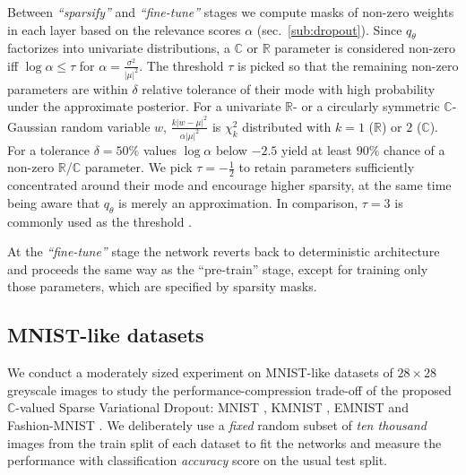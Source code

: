 \documentclass{article}
\newcommand{\real}{\mathbb{R}}
\newcommand{\cplx}{\mathbb{C}}
\begin{document}
Between \emph{``sparsify''} and \emph{``fine-tune''} stages we compute masks of non-zero
weights in each layer based on the relevance scores $\alpha$ (sec.~\ref{sub:dropout}).
Since $q_\theta$ factorizes into univariate distributions, a $\cplx$ or $\real$ parameter
is considered non-zero iff $\log \alpha \leq \tau$ for $
  \alpha = \tfrac{\sigma^2}{\lvert \mu \rvert^2}
$.
The threshold $\tau$ is picked so that the remaining non-zero parameters are within
$\delta$ relative tolerance of their mode with high probability under the approximate
posterior. For a univariate $\real$- or a circularly symmetric $\cplx$-Gaussian random
variable $w$, $
  \tfrac{k \lvert w - \mu \rvert^2}
        {\alpha \lvert \mu \rvert^2}
$ is $\chi^2_k$ distributed with $k=1$ ($\real$) or $2$ ($\cplx$).
%
For a tolerance $\delta = 50\%$ values $\log \alpha$ below $-2.5$ yield at least $90\%$
chance of a non-zero $\real$/$\cplx$ parameter. We pick $\tau = -\tfrac12$ to retain
parameters sufficiently concentrated around their mode and encourage higher sparsity,
at the same time being aware that $q_\theta$ is merely an approximation. In comparison,
$\tau = 3$ is commonly used as the threshold
\citep{molchanov_variational_2017,kingma_variational_2015}.

At the \emph{``fine-tune''} stage the network reverts back to deterministic architecture
and proceeds the same way as the ``pre-train'' stage, except for training only those
parameters, which are specified by sparsity masks.



\subsection{MNIST-like datasets} %
\label{sub:mnist_like_datasets}

We conduct a moderately sized experiment on MNIST-like datasets of $28\times 28$ greyscale
images to study the performance-compression trade-off of the proposed $\cplx$-valued Sparse
Variational Dropout: MNIST \citep{lecun_gradient-based_1998}, KMNIST \citep{clanuwat_deep_2018},
EMNIST \citep{cohen_emnist_2017} and Fashion-MNIST \citep{xiao_fashion-mnist_2017}.
%
We deliberately use a \emph{fixed} random subset of \emph{ten thousand} images from the train
split of each dataset to fit the networks and measure the performance with classification
\emph{accuracy} score on the usual test split.
\end{document}
